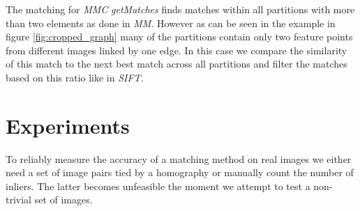 \documentclass[12pt,journal]{IEEEtran}
\begin{document}
The matching for \emph{MMC} \emph{getMatches} finds matches within all 
partitions with more than two elements as done in \emph{MM}. However as 
can be seen in the example in figure \ref{fig:cropped_graph} many of the 
partitions contain only two feature points from different images linked 
by one edge. In this case we compare the similarity of this match to the 
next best match across all partitions and filter the matches based on 
this ratio like in \emph{SIFT}.
%
%
\section{Experiments}
\label{experiment}
%
To reliably measure the accuracy of a matching method on real images we 
either need a set of image pairs tied by a homography or manually count 
the number of inliers. The latter becomes unfeasible the moment we 
attempt to test a non-trivial set of images. 
\end{document}
